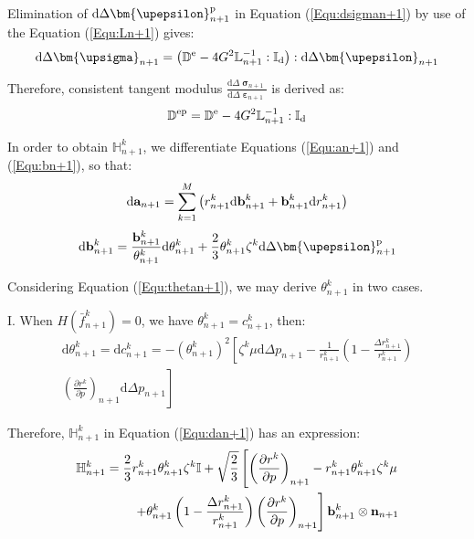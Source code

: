 Elimination of ${\text{d}}\Delta {\bm{\upepsilon }}_{n + 1}^{\rm{p}}$ in Equation (\ref{Equ:dsigman+1}) by use of the Equation (\ref{Equ:Ln+1}) gives:
\begin{equation}
{\text{d}}\Delta {{\bm{\upsigma }}_{n + 1}} = \left( {{\mathbb{D}^{\rm{e}}} - 4{G^2}\mathbb{L}_{n + 1}^{ - 1}:{\mathbb{I}_{\rm{d}}}} \right):{\text{d}}\Delta {{\bm{\upepsilon }}_{n + 1}}
\end{equation}

Therefore, consistent tangent modulus $\frac{{{\text{d}}\Delta {{\bm{\upsigma }}_{n + 1}}}}{{{\text{d}}\Delta {{\bm{\upepsilon }}_{n + 1}}}}$ is derived as:
\begin{equation}
{\mathbb{D}^{\rm{ep}}} = {\mathbb{D}^{\rm{e}}} - 4{G^2}\mathbb{L}_{n + 1}^{ - 1}:{\mathbb{I}_{\rm{d}}}
\end{equation}

In order to obtain $\mathbb{H}_{n + 1}^k$, we differentiate Equations (\ref{Equ:an+1}) and (\ref{Equ:bn+1}), so that:
\begin{equation}
{\text{d}}{{\bf{a}}_{n + 1}} = \sum\limits_{k = 1}^M {\left( {r_{n + 1}^k{\text{d}}{\bf{b}}_{n + 1}^k + {\bf{b}}_{n + 1}^k{\text{d}}r_{n + 1}^k} \right)}
\end{equation}
\begin{equation}
\label{Equ:dbn+1}
{\text{d}}{\bf{b}}_{n + 1}^k = \frac{{{\bf{b}}_{n + 1}^k}}{{\theta _{n + 1}^k}}{\text{d}}\theta _{n + 1}^k + \frac{2}{3}\theta _{n + 1}^k{\zeta ^k}{\text{d}}\Delta {\bm{\upepsilon }}_{n + 1}^{\rm{p}}
\end{equation}

Considering Equation (\ref{Equ:thetan+1}), we may derive $\theta _{n + 1}^k$ in two cases.

I. When $H\left( {\bar f_{n + 1}^k} \right) = 0$, we have $\theta _{n + 1}^k = c_{n + 1}^k$, then:
\begin{equation}
\begin{aligned}
{\text{d}}\theta _{n + 1}^k = {\text{d}}c_{n + 1}^k =  - {\left( {\theta _{n + 1}^k} \right)^2} \left[ {\zeta ^k}\mu {\text{d}}\Delta {p_{n + 1}} - \frac{1}{{r_{n + 1}^k}}\left( {1 - \frac{{\Delta r_{n + 1}^k}}{{r_{n + 1}^k}}} \right)\right.\\
\left.{{\left( {\frac{{\partial {r^k}}}{{\partial p}}} \right)}_{n + 1}}{\text{d}}\Delta {p_{n + 1}} \right]
\end{aligned}
\end{equation}

Therefore, $\mathbb{H}_{n + 1}^k$ in Equation (\ref{Equ:dan+1}) has an expression:
\begin{equation}
\begin{aligned}
\mathbb{H}_{n + 1}^k = \frac{2}{3}r_{n + 1}^k\theta _{n + 1}^k{\zeta ^k}\mathbb{I} + \sqrt {\frac{2}{3}} \left[ {{\left( {\frac{{\partial {r^k}}}{{\partial p}}} \right)}_{n + 1}} - r_{n + 1}^k\theta _{n + 1}^k{\zeta ^k}\mu \right.\\
\left. + \theta _{n + 1}^k\left( {1 - \frac{{\Delta r_{n + 1}^k}}{{r_{n + 1}^k}}} \right){{\left( {\frac{{\partial {r^k}}}{{\partial p}}} \right)}_{n + 1}} \right]{\bf{b}}_{n + 1}^k \otimes {{\bf{n}}_{n + 1}}
\end{aligned}
\end{equation}

